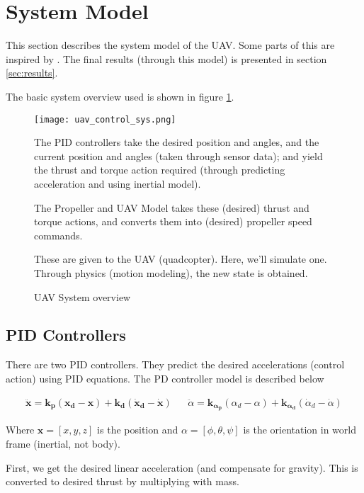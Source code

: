 \section{System Model}

This section describes the system model of the UAV. Some parts of this are inspired by \cite{mahony2012multirotor}. The final results (through this model) is presented in section \ref{sec:results}.

The basic system overview used is shown in figure \ref{fig:sys-overview}.

\begin{figure}[h]
    \centering
    \texttt{[image: uav\_control\_sys.png]}
    \caption{UAV System overview}
    \label{fig:sys-overview}
    \small
        The PID controllers take the desired position and angles, and the current position and angles (taken through sensor data); and yield the thrust and torque action required (through predicting acceleration and using inertial model).

        The Propeller and UAV Model takes these (desired) thrust and torque actions, and converts them into (desired) propeller speed commands.

        These are given to the UAV (quadcopter). Here, we'll simulate one. Through physics (motion modeling), the new state is obtained.
\end{figure}

\subsection{PID Controllers}

There are two PID controllers. They predict the desired accelerations (control action) using PID equations. The PD controller model is described below

\begin{align}
    \mathbf{\ddot{x}} = \mathbf{k_p} (\mathbf{x_d - x}) + \mathbf{k_d} (\mathbf{\dot{x}_d - \dot{x}})
    &&
    \ddot{\alpha} = \mathbf{k_{\alpha_p}} (\alpha_d - \alpha) + \mathbf{k_{\alpha_d}} (\dot{\alpha}_d - \dot{\alpha})
\end{align}

Where $\mathbf{x} = [ x, y, z ]$ is the position and $\alpha = [ \phi, \theta, \psi ]$ is the orientation in world frame (inertial, not body).

First, we get the desired linear acceleration (and compensate for gravity). This is converted to desired thrust by multiplying with mass.

